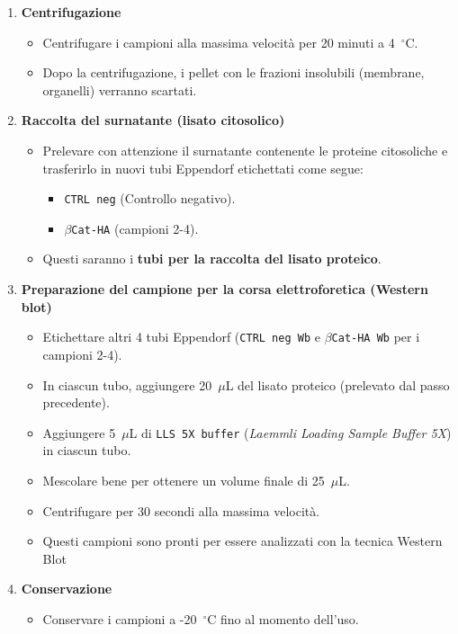 \begin{enumerate}
\item \textbf{Centrifugazione}
\begin{itemize}
\item Centrifugare i campioni alla massima velocità per 20 minuti a 4~$^\circ$C.
\item Dopo la centrifugazione, i pellet con le frazioni insolubili (membrane, organelli) verranno scartati.
\end{itemize}

\item \textbf{Raccolta del surnatante (lisato citosolico)}
\begin{itemize}
\item Prelevare con attenzione il surnatante contenente le proteine citosoliche e trasferirlo in nuovi tubi Eppendorf etichettati come segue:
\begin{itemize}
\item \texttt{CTRL neg} (Controllo negativo).
\item \texttt{$\beta$Cat-HA} (campioni 2-4).
\end{itemize}
\item Questi saranno i \textbf{tubi per la raccolta del lisato proteico}.
\end{itemize}

\item \textbf{Preparazione del campione per la corsa elettroforetica (Western blot)}
\begin{itemize}
\item Etichettare altri 4 tubi Eppendorf (\texttt{CTRL neg Wb} e \texttt{$\beta$Cat-HA Wb} per i campioni 2-4).
\item In ciascun tubo, aggiungere 20~$\mu$L del lisato proteico (prelevato dal passo precedente).
\item Aggiungere 5~$\mu$L di \texttt{LLS 5X buffer} (\textit{Laemmli Loading Sample Buffer 5X}) in ciascun tubo.
\item Mescolare bene per ottenere un volume finale di 25~$\mu$L.
\item Centrifugare per 30 secondi alla massima velocità.
\item Questi campioni sono pronti per essere analizzati con la tecnica Western Blot
\end{itemize}

\item \textbf{Conservazione}
\begin{itemize}
\item Conservare i campioni a -20~$^\circ$C fino al momento dell’uso.
\end{itemize}
\end{enumerate}

\newpage